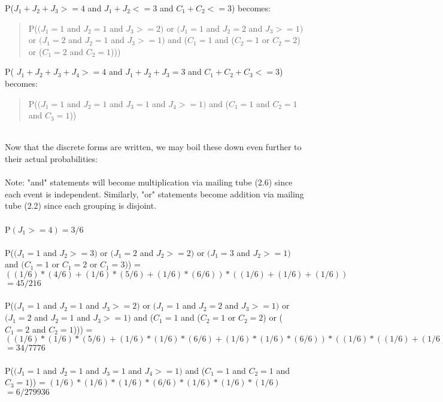 \documentclass{article}
\begin{document}
\begin{enumerate}
\begin{enumerate}
\begin{quote}
            \end{quote}
            P($J_1 + J_2 + J_3 >= 4$ and $J_1 + J_2 <= 3$ and $C_1 + C_2 <= 3$) becomes:
            \begin{quote}
            P($(J_1 = 1$ and $J_2 = 1$ and $J_3 >= 2)$ or $(J_1 = 1$ and $J_2 = 2$ and $J_3 >= 1)$ or $(J_1 = 2$ and $J_2 = 1$ and $J_3 >= 1)$ and ($C_1 = 1$ and ($C_2 = 1$ or $C_2 = 2$) or ($C_1 = 2$ and $C_2 = 1$)))
            \end{quote}
            P( $J_1 + J_2 + J_3 + J_4 >= 4$ and $J_1 + J_2 + J_3 = 3$ and $C_1 + C_2 + C_3 <= 3$) becomes:
            \begin{quote}
            P($(J_1 = 1$ and $J_2 = 1$ and $J_3 = 1$ and $J_4 >= 1)$ and ($C_1 = 1$ and $C_2 = 1$ and $C_3 = 1$)) 
            \end{quote}
            \\
             Now that the discrete forms are written, we may boil these down even further to their actual probabilities:\\
             \\
             Note: "and" statements will become multiplication via mailing tube (2.6) since each event is independent. Similarly, "or" statements become addition via mailing tube (2.2) since each grouping is disjoint. 
             \\
            \\ P$(J_1 >= 4) = 3/6$
            \\
            \\ P($(J_1 = 1$ and $J_2 >= 3)$ or $(J_1 = 2$ and $J_2 >= 2)$ or $(J_1 = 3$ and $J_2 >= 1) $ and $(C_1 = 1$ or $C_1 = 2$ or $C_1 = 3)$) = $((1/6)*(4/6)+(1/6)*(5/6)+(1/6)*(6/6))*((1/6)+(1/6)+(1/6))$
            \\$= 45/216 $
            \\
            \\  P($(J_1 = 1$ and $J_2 = 1$ and $J_3 >= 2)$ or $(J_1 = 1$ and $J_2 = 2$ and $J_3 >= 1)$ or $(J_1 = 2$ and $J_2 = 1$ and $J_3 >= 1)$ and ($C_1 = 1$ and ($C_2 = 1$ or $C_2 = 2$) or ($C_1 = 2$ and $C_2 = 1$))) =  $((1/6)*(1/6)*(5/6)+(1/6)*(1/6)*(6/6)+(1/6)*(1/6)*(6/6))*((1/6)*((1/6)+(1/6))+(1/6)*(1/6))$
            \\ $= 34/7776$
            \\
            \\ P($(J_1 = 1$ and $J_2 = 1$ and $J_3 = 1$ and $J_4 >= 1)$ and ($C_1 = 1$ and $C_2 = 1$ and $C_3 = 1$))  = $ (1/6)*(1/6)*(1/6)*(6/6)*(1/6)*(1/6)*(1/6)$ 
            \\ $= 6/279936$

\end{enumerate}
\end{enumerate}
\end{document}
